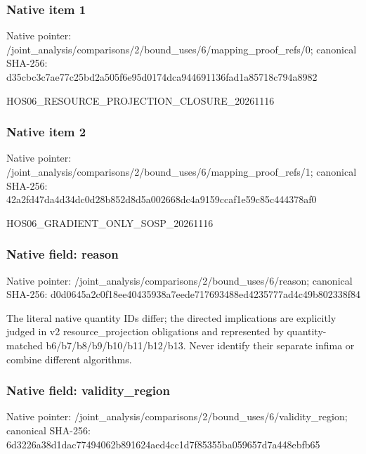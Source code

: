 \documentclass[10pt,a4paper]{article}
\begin{document}
\subsubsection{Native item 1}
Native pointer: /joint\_\allowbreak{}analysis/comparisons/2/bound\_\allowbreak{}uses/6/mapping\_\allowbreak{}proof\_\allowbreak{}refs/0; canonical SHA-256: d35cbc3c7ae77c25bd2a505f6e95d0174dca944691136fad1a85718c794a8982

\begingroup\raggedright\sloppy HOS06\_\allowbreak{}RESOURCE\_\allowbreak{}PROJECTION\_\allowbreak{}CLOSURE\_\allowbreak{}20261116\par\endgroup

\subsubsection{Native item 2}
Native pointer: /joint\_\allowbreak{}analysis/comparisons/2/bound\_\allowbreak{}uses/6/mapping\_\allowbreak{}proof\_\allowbreak{}refs/1; canonical SHA-256: 42a2fd47da4d34dc0d28b852d8d5a002668dc4a9159ccaf1e59c85c444378af0

\begingroup\raggedright\sloppy HOS06\_\allowbreak{}GRADIENT\_\allowbreak{}ONLY\_\allowbreak{}SOSP\_\allowbreak{}20261116\par\endgroup

\subsubsection{Native field: reason}
Native pointer: /joint\_\allowbreak{}analysis/comparisons/2/bound\_\allowbreak{}uses/6/reason; canonical SHA-256: d0d0645a2c0f18ee40435938a7eede717693488ed4235777ad4c49b802338f84

\begingroup\raggedright\sloppy The literal native quantity IDs differ;\allowbreak{} the directed implications are explicitly judged in v2 resource\_\allowbreak{}projection obligations and represented by quantity-matched b6/\allowbreak{}b7/\allowbreak{}b8/\allowbreak{}b9/\allowbreak{}b10/\allowbreak{}b11/\allowbreak{}b12/\allowbreak{}b13. Never identify their separate infima or combine different algorithms.\par\endgroup

\subsubsection{Native field: validity\_\allowbreak{}region}
Native pointer: /joint\_\allowbreak{}analysis/comparisons/2/bound\_\allowbreak{}uses/6/validity\_\allowbreak{}region; canonical SHA-256: 6d3226a38d1dac77494062b891624aed4cc1d7f85355ba059657d7a448ebfb65
\end{document}
